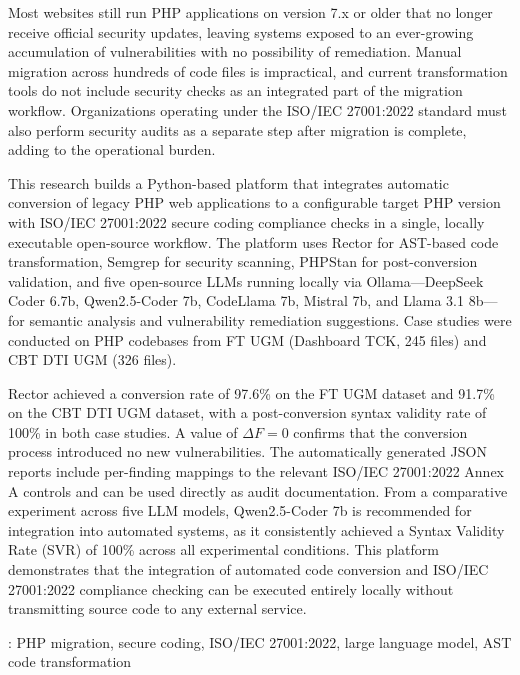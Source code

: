  
Most websites still run PHP applications on version 7.x or older that no longer receive official security updates, leaving systems exposed to an ever-growing accumulation of vulnerabilities with no possibility of remediation. Manual migration across hundreds of code files is impractical, and current transformation tools do not include security checks as an integrated part of the migration workflow. Organizations operating under the ISO/IEC 27001:2022 standard must also perform security audits as a separate step after migration is complete, adding to the operational burden.
 
\hspace{1cm} This research builds a Python-based platform that integrates automatic conversion of legacy PHP web applications to a configurable target PHP version with ISO/IEC 27001:2022 secure coding compliance checks in a single, locally executable open-source workflow. The platform uses Rector for AST-based code transformation, Semgrep for security scanning, PHPStan for post-conversion validation, and five open-source LLMs running locally via Ollama---DeepSeek Coder 6.7b, Qwen2.5-Coder 7b, CodeLlama 7b, Mistral 7b, and Llama 3.1 8b---for semantic analysis and vulnerability remediation suggestions. Case studies were conducted on PHP codebases from FT UGM (Dashboard TCK, 245 files) and CBT DTI UGM (326 files).
 
\hspace{1cm} Rector achieved a conversion rate of 97.6\% on the FT UGM dataset and 91.7\% on the CBT DTI UGM dataset, with a post-conversion syntax validity rate of 100\% in both case studies. A value of $\Delta F = 0$ confirms that the conversion process introduced no new vulnerabilities. The automatically generated JSON reports include per-finding mappings to the relevant ISO/IEC 27001:2022 Annex A controls and can be used directly as audit documentation. From a comparative experiment across five LLM models, Qwen2.5-Coder 7b is recommended for integration into automated systems, as it consistently achieved a Syntax Validity Rate (SVR) of 100\% across all experimental conditions. This platform demonstrates that the integration of automated code conversion and ISO/IEC 27001:2022 compliance checking can be executed entirely locally without transmitting source code to any external service.
 
: PHP migration, secure coding, ISO/IEC 27001:2022, large language model, AST code transformation